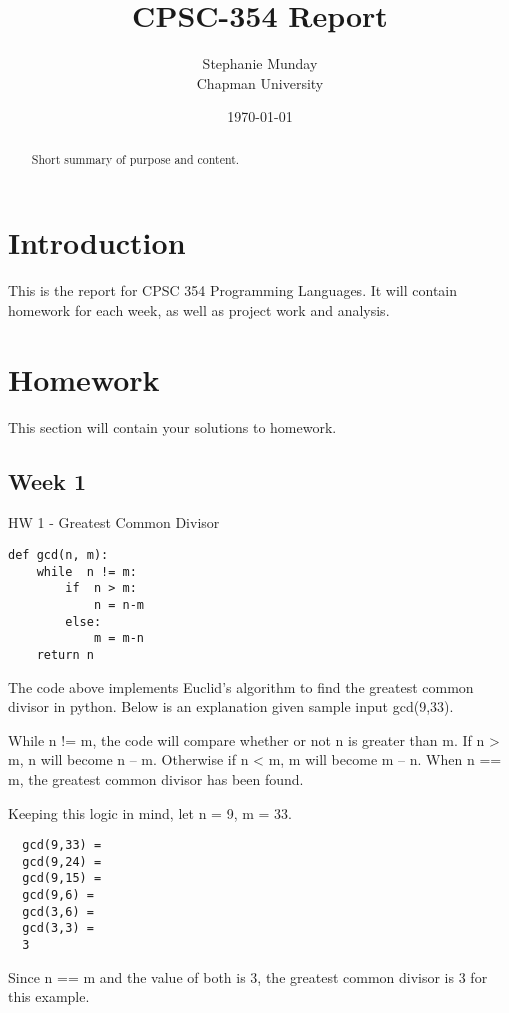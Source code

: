 \documentclass{article}
\title{CPSC-354 Report}
\author{Stephanie Munday  \\ Chapman University}
\date{\today}
\theoremstyle{theorem}
\theoremstyle{definition}
\theoremstyle{remark}
\begin{document}
\maketitle

\begin{abstract}
Short  summary of purpose and content.  
\end{abstract}

\tableofcontents

\section{Introduction}\label{intro}

This is the report for CPSC 354 Programming Languages. It will contain homework for each week, as well as project work and analysis.


\section{Homework}\label{homework}

This section will contain your solutions to homework. 

\subsection{Week 1}

HW 1 - Greatest Common Divisor

\begin{lstlisting}
def gcd(n, m):
    while  n != m:
        if  n > m:
            n = n-m
        else:
            m = m-n
    return n 
\end{lstlisting}
%
The code above implements Euclid's algorithm to find the greatest common divisor in python. Below is an explanation given sample input gcd(9,33).

\medskip\noindent
While n != m, the code will compare whether or not n is greater than m. If n \textgreater{} m, n will become n -- m. Otherwise if n \textless{} m, m will become m -- n. When n == m, the greatest common divisor has been found.

\medskip\noindent
Keeping this logic in mind, let n = 9, m = 33.

\begin{lstlisting}
  gcd(9,33) =
  gcd(9,24) =
  gcd(9,15) =
  gcd(9,6) =
  gcd(3,6) =
  gcd(3,3) =
  3
  \end{lstlisting}

\medskip\noindent
Since n == m and the value of both is 3, the greatest common divisor is 3 for this example.
\end{document}
